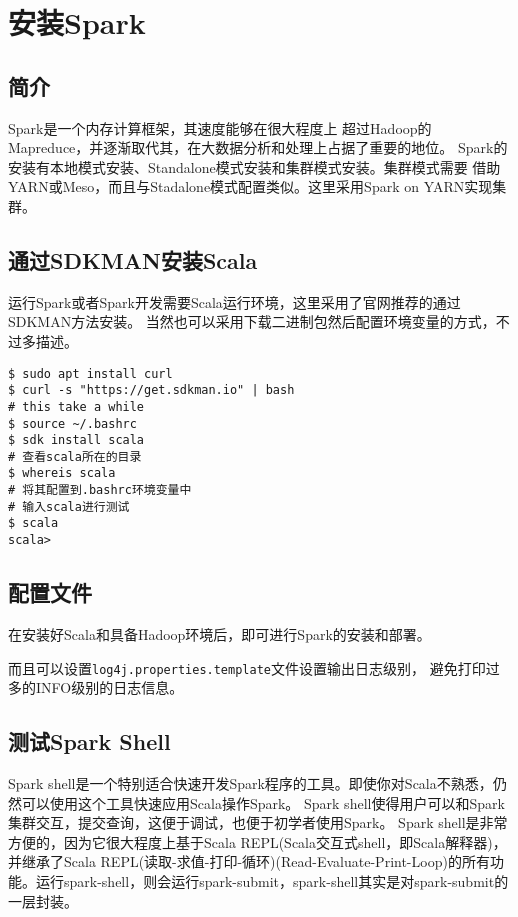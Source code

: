 \section{安装Spark}
\subsection{简介}
Spark是一个内存计算框架，其速度能够在很大程度上
超过Hadoop的Mapreduce，并逐渐取代其，在大数据分析和处理上占据了重要的地位。
Spark的安装有本地模式安装、Standalone模式安装和集群模式安装。集群模式需要
借助YARN或Meso，而且与Stadalone模式配置类似。这里采用Spark on YARN实现集群。

\subsection{通过SDKMAN安装Scala}
运行Spark或者Spark开发需要Scala运行环境，这里采用了官网推荐的通过SDKMAN方法安装。
当然也可以采用下载二进制包然后配置环境变量的方式，不过多描述。

\begin{lstlisting}[style=mysh,title=安装Scala]
$ sudo apt install curl
$ curl -s "https://get.sdkman.io" | bash
# this take a while
$ source ~/.bashrc
$ sdk install scala
# 查看scala所在的目录
$ whereis scala
# 将其配置到.bashrc环境变量中
# 输入scala进行测试
$ scala
scala> 
\end{lstlisting}
\subsection{配置文件}
在安装好Scala和具备Hadoop环境后，即可进行Spark的安装和部署。


而且可以设置\lstinline{log4j.properties.template}文件设置输出日志级别，
避免打印过多的INFO级别的日志信息。
\subsection{测试Spark Shell}
Spark shell是一个特别适合快速开发Spark程序的工具。即使你对Scala不熟悉，仍然可以使用这个工具快速应用Scala操作Spark。
Spark shell使得用户可以和Spark集群交互，提交查询，这便于调试，也便于初学者使用Spark。
Spark shell是非常方便的，因为它很大程度上基于Scala REPL(Scala交互式shell，即Scala解释器)，并继承了Scala REPL(读取-求值-打印-循环)(Read-Evaluate-Print-Loop)的所有功能。运行spark-shell，则会运行spark-submit，spark-shell其实是对spark-submit的一层封装。

